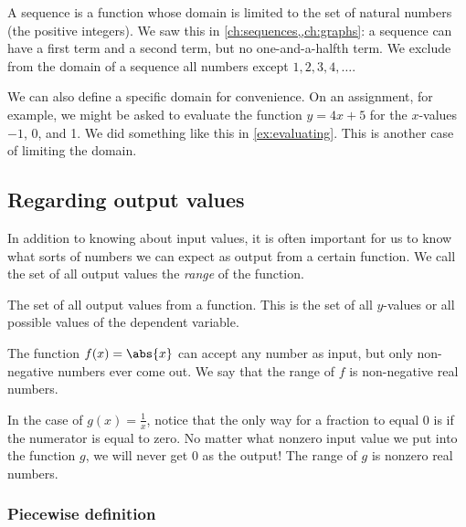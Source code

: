 A sequence is a function whose domain is limited to the set of natural numbers (the positive integers). We saw this in \cref{ch:sequences,,ch:graphs}: a sequence can have a first term and a second term, but no one-and-a-halfth term. We exclude from the domain of a sequence all numbers except $1, 2, 3, 4, \dotsc$.

We can also define a specific domain for convenience. On an assignment, for example, we might be asked to evaluate the function $y=4x+5$ for the $x$-values $-1$, 0, and 1. We did something like this in \cref{ex:evaluating}. This is another case of limiting the domain.



\subsection{Regarding output values}

In addition to knowing about input values, it is often important for us to know what sorts of numbers we can expect as output from a certain function. We call the set of all output values the \textit{range} of the function.

\begin{boxdef}[Range]
The set of all output values from a function. This is the set of all $y$-values or all possible values of the dependent variable.
\end{boxdef}

The function $f(x) = \abs{x}$ can accept any number as input, but only non-negative numbers ever come out. We say that the range of $f$ is non-negative real numbers.

In the case of $g(x) = \frac{1}{x}$, notice that the only way for a fraction to equal 0 is if the numerator is equal to zero. No matter what nonzero input value we put into the function $g$, we will never get 0 as the output! The range of $g$ is nonzero real numbers.


\subsubsection{Piecewise definition}

